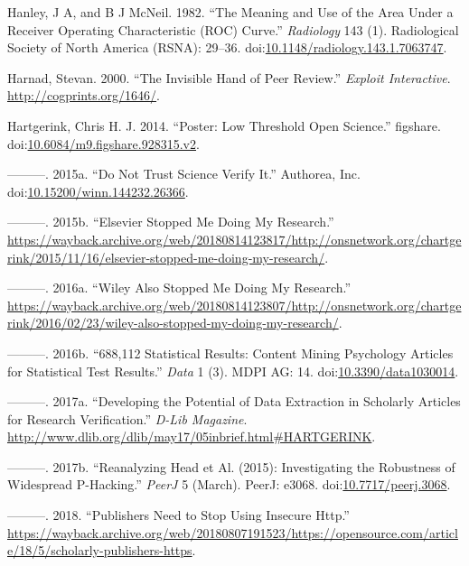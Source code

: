 \documentclass[a5paper]{book}
\begin{document}
\hypertarget{ref-doi:10.1148ux2fradiology.143.1.7063747}{}
Hanley, J A, and B J McNeil. 1982. ``The Meaning and Use of the Area
Under a Receiver Operating Characteristic (ROC) Curve.''
\emph{Radiology} 143 (1). Radiological Society of North America (RSNA):
29--36.
doi:\href{https://doi.org/10.1148/radiology.143.1.7063747}{10.1148/radiology.143.1.7063747}.

\hypertarget{ref-cogprints1646}{}
Harnad, Stevan. 2000. ``The Invisible Hand of Peer Review.''
\emph{Exploit Interactive}. \url{http://cogprints.org/1646/}.

\hypertarget{ref-doi:10.6084ux2fm9.figshare.928315.v2}{}
Hartgerink, Chris H. J. 2014. ``Poster: Low Threshold Open Science.''
figshare.
doi:\href{https://doi.org/10.6084/m9.figshare.928315.v2}{10.6084/m9.figshare.928315.v2}.

\hypertarget{ref-doi:10.15200ux2fwinn.144232.26366}{}
---------. 2015a. ``Do Not Trust Science Verify It.'' Authorea, Inc.
doi:\href{https://doi.org/10.15200/winn.144232.26366}{10.15200/winn.144232.26366}.

\hypertarget{ref-ons-elsevier}{}
---------. 2015b. ``Elsevier Stopped Me Doing My Research.''
\url{https://wayback.archive.org/web/20180814123817/http://onsnetwork.org/chartgerink/2015/11/16/elsevier-stopped-me-doing-my-research/}.

\hypertarget{ref-ons-wiley}{}
---------. 2016a. ``Wiley Also Stopped Me Doing My Research.''
\url{https://wayback.archive.org/web/20180814123807/http://onsnetwork.org/chartgerink/2016/02/23/wiley-also-stopped-my-doing-my-research/}.

\hypertarget{ref-doi:10.3390ux2fdata1030014}{}
---------. 2016b. ``688,112 Statistical Results: Content Mining
Psychology Articles for Statistical Test Results.'' \emph{Data} 1 (3).
MDPI AG: 14.
doi:\href{https://doi.org/10.3390/data1030014}{10.3390/data1030014}.

\hypertarget{ref-Hartgerink-dlib2017}{}
---------. 2017a. ``Developing the Potential of Data Extraction in
Scholarly Articles for Research Verification.'' \emph{D-Lib Magazine}.
\url{http://www.dlib.org/dlib/may17/05inbrief.html\#HARTGERINK}.

\hypertarget{ref-doi:10.7717ux2fpeerj.3068}{}
---------. 2017b. ``Reanalyzing Head et Al. (2015): Investigating the
Robustness of Widespread P-Hacking.'' \emph{PeerJ} 5 (March). PeerJ:
e3068.
doi:\href{https://doi.org/10.7717/peerj.3068}{10.7717/peerj.3068}.

\hypertarget{ref-https-hartgerink}{}
---------. 2018. ``Publishers Need to Stop Using Insecure Http.''
\url{https://wayback.archive.org/web/20180807191523/https://opensource.com/article/18/5/scholarly-publishers-https}.
\end{document}
